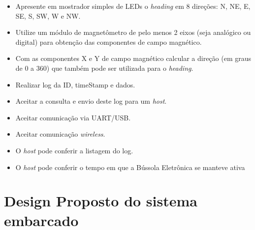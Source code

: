 \documentclass[10pt,twocolumn,letterpaper]{article}
\begin{document}
\begin{itemize}
    \item Apresente em mostrador simples de LEDs o \emph{heading} em 8 direções: N, NE, E, SE, S, SW, W e NW.
    \item Utilize um módulo de magnetômetro de pelo menos 2 eixos (seja analógico ou digital) para obtenção 
    das componentes de campo magnético.
    \item Com as componentes X e Y de campo magnético calcular a direção (em graus de 0 a 360) que também 
    pode ser utilizada para o \emph{heading}.
    \item Realizar log da ID, timeStamp e dados.
    \item Aceitar a consulta e envio deste log para um \emph{host}.
    \item Aceitar comunicação via UART/USB.
    \item Aceitar comunicação \emph{wireless}.
    \item O \emph{host} pode conferir a listagem do log.
    \item O \emph{host} pode conferir o tempo em que a Bússola Eletrônica se manteve ativa 
\end{itemize}

\section{Design Proposto do sistema embarcado}
\end{document}
